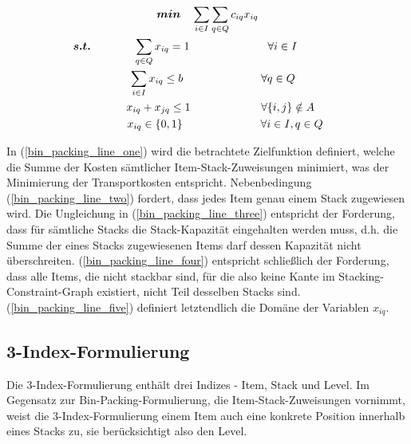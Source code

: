 \begin{gather}
\boldsymbol{min} \quad \sum_{i \in I} \sum_{q \in Q} c_{iq} x_{iq} \label{bin_packing_line_one} \\
\thinspace\thinspace \boldsymbol{s.t.} \thinspace\quad\thinspace\thinspace\thinspace\quad\thinspace \quad \sum_{q \in Q} x_{iq} = 1 \quad\quad\quad\quad\quad\quad\quad \forall i \in I \quad\quad\quad\quad\thinspace\thinspace \label{bin_packing_line_two} \\
\quad \sum_{i \in I} x_{iq} \leq b \quad\quad\quad\quad\quad\quad\quad \forall q \in Q \label{bin_packing_line_three} \\
\thinspace\thinspace\quad\quad x_{iq} + x_{jq} \leq 1 \quad\quad\thinspace\thinspace\quad\quad\quad\quad \forall \{i, j\} \notin A \label{bin_packing_line_four} \\
\thinspace\thinspace\quad\quad\quad x_{iq} \in \{0, 1\} \thinspace\thinspace\thinspace\thinspace\thinspace\thinspace\quad\quad\quad\quad\quad\quad \forall i \in I, q \in Q \thinspace \label{bin_packing_line_five}
\end{gather}

In (\ref{bin_packing_line_one}) wird die betrachtete Zielfunktion definiert, welche die Summe der Kosten sämtlicher
Item-Stack-Zuweisungen minimiert, was der Minimierung der Transportkosten entspricht.
Nebenbedingung (\ref{bin_packing_line_two}) fordert, dass jedes Item genau einem Stack zugewiesen wird. Die Ungleichung in (\ref{bin_packing_line_three}) entspricht der Forderung, dass für sämtliche Stacks die Stack-Kapazität eingehalten werden muss, d.h.
die Summe der eines Stacks zugewiesenen Items darf dessen Kapazität nicht überschreiten. (\ref{bin_packing_line_four}) entspricht schließlich der Forderung, dass alle Items, die nicht stackbar sind, für die also keine Kante im Stacking-Constraint-Graph existiert, nicht Teil desselben Stacks sind. (\ref{bin_packing_line_five}) definiert letztendlich die Domäne der Variablen $x_{iq}$.

\subsection{3-Index-Formulierung}
\label{sec:three_idx_formulation}

Die 3-Index-Formulierung enthält drei Indizes - Item, Stack und Level.
Im Gegensatz zur Bin-Packing-Formulierung, die Item-Stack-Zuweisungen vornimmt, weist die 3-Index-Formulierung einem
Item auch eine konkrete Position innerhalb eines Stacks zu, sie berücksichtigt also den Level.

